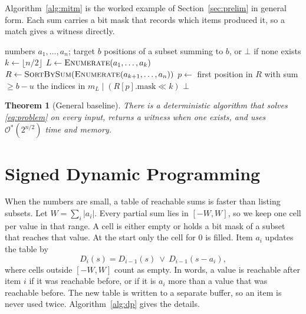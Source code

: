 \documentclass[conference]{IEEEtran}
\newtheorem{theorem}{Theorem}
\newcommand{\Oh}{\mathcal{O}}
\begin{document}
Algorithm~\ref{alg:mitm} is the worked example of Section~\ref{sec:prelim} in
general form. Each sum carries a bit mask that records which items produced it,
so a match gives a witness directly.

\begin{algorithm}[t]
\caption{Sorted meet-in-the-middle}
\label{alg:mitm}
\begin{algorithmic}[1]
\Require numbers $a_1,\dots,a_n$; target $b$
\Ensure positions of a subset summing to $b$, or $\bot$ if none exists
\State $k \gets \lfloor n/2 \rfloor$
\State $L \gets \textsc{Enumerate}(a_1,\dots,a_k)$
\State $R \gets \textsc{SortBySum}(\textsc{Enumerate}(a_{k+1},\dots,a_n))$
  \State $p \gets$ first position in $R$ with sum $\ge b-u$ 
     \State \Return the indices in $m_L \mid (R[p].\mathrm{mask}\ll k)$
  \EndIf
\EndFor
\State \Return $\bot$
\end{algorithmic}
\end{algorithm}

\begin{theorem}[General baseline]\label{thm:mitm}
There is a deterministic algorithm that solves \eqref{eq:problem} on every
input, returns a witness when one exists, and uses $\Oh^*(2^{n/2})$ time and
memory.
\end{theorem}

\section{Signed Dynamic Programming}\label{sec:dp}
When the numbers are small, a table of reachable sums is faster than listing
subsets. Let $W=\sum_i|a_i|$. Every partial sum lies in $[-W,W]$, so we keep one
cell per value in that range. A cell is either empty or holds a bit mask of a
subset that reaches that value. At the start only the cell for $0$ is filled.
Item $a_i$ updates the table by
\begin{equation}\label{eq:dp}
D_i(s)=D_{i-1}(s)\ \lor\ D_{i-1}(s-a_i),
\end{equation}
where cells outside $[-W,W]$ count as empty. In words, a value is reachable
after item $i$ if it was reachable before, or if it is $a_i$ more than a value
that was reachable before. The new table is written to a separate buffer, so an
item is never used twice. Algorithm~\ref{alg:dp} gives the details.
\end{document}
